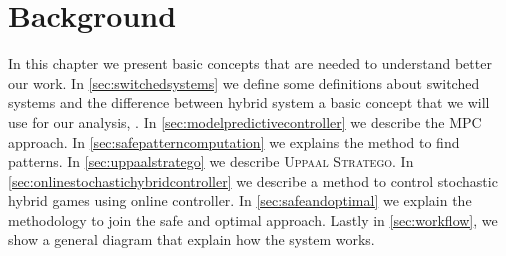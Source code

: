 \chapter{Background}
\label{ch:background}
In this chapter we present basic concepts that are needed to understand better
our work. In \autoref{sec:switchedsystems} we define some definitions about switched systems 
and the difference between hybrid system a basic concept that we will use for our
analysis, \cite{sanfelice2020hybrid}. In \autoref{sec:modelpredictivecontroller} we 
describe the \ac{MPC} approach. In \autoref{sec:safepatterncomputation} we explains
the method to find patterns. In \autoref{sec:uppaalstratego} we describe 
\textsc{Uppaal Stratego}. In \autoref{sec:onlinestochastichybridcontroller} we describe
a method to control stochastic hybrid games using online controller. In \autoref{sec:safeandoptimal}
we explain the methodology to join the safe and optimal approach. Lastly in 
\autoref{sec:workflow}, we show a general diagram that explain how the system works.
\clearpage
